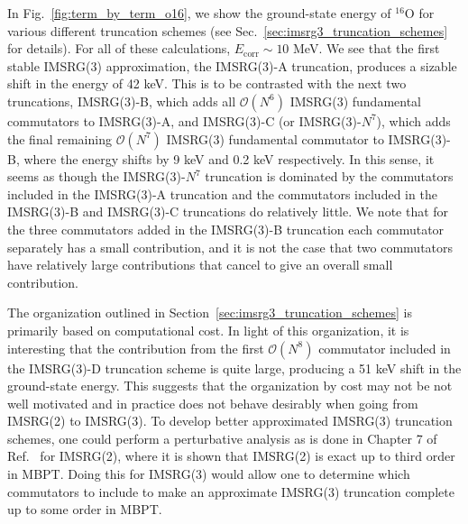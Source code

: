 In Fig.~\ref{fig:term_by_term_o16},
we show the ground-state energy of
${}^{16}\text{O}$
for various different truncation schemes
(see Sec.~\ref{sec:imsrg3_truncation_schemes} for details).
For all of these calculations, $E_{\text{corr}} \sim 10$ MeV.
We see that the first stable IMSRG(3) approximation,
the IMSRG(3)-A truncation,
produces a sizable shift in the energy of 42 keV.
This is to be contrasted with the next two truncations,
IMSRG(3)-B,
which adds all $\mathcal{O}(N^6)$ IMSRG(3) fundamental commutators
to IMSRG(3)-A,
and IMSRG(3)-C (or IMSRG(3)-$N^7$),
which adds the final remaining $\mathcal{O}(N^7)$ IMSRG(3) fundamental commutator
to IMSRG(3)-B,
where the energy shifts by 9 keV and 0.2 keV respectively.
In this sense,
it seems as though the IMSRG(3)-$N^7$ truncation
is dominated by the commutators included in the IMSRG(3)-A truncation
and the commutators included in the IMSRG(3)-B and IMSRG(3)-C truncations
do relatively little.
We note that for the three commutators added in the IMSRG(3)-B truncation
each commutator separately has a small contribution,
and it is not the case that two commutators have relatively large contributions
that cancel to give an overall small contribution.

The organization outlined in Section~\ref{sec:imsrg3_truncation_schemes}
is primarily based on computational cost.
In light of this organization,
it is interesting that the contribution from the first
$\mathcal{O}(N^8)$ commutator included in the IMSRG(3)-D truncation scheme
is quite large,
producing a 51 keV shift in the ground-state energy.
This suggests that the organization by cost may not be not well motivated
and in practice does not behave desirably when
going from IMSRG(2) to IMSRG(3).
To develop better approximated IMSRG(3) truncation schemes,
one could perform a perturbative analysis as is done in Chapter 7 of Ref.~\cite{Herg15imsrgphysrep}
for IMSRG(2),
where it is shown that IMSRG(2) is exact up to third order in MBPT.
Doing this for IMSRG(3)
would allow one to determine which commutators
to include to make an approximate IMSRG(3) truncation complete
up to some order in MBPT.
